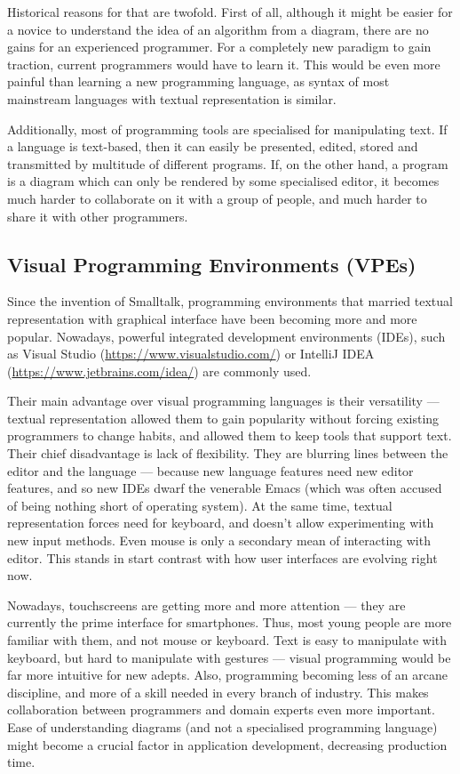 \documentclass[11pt]{scrartcl}
\begin{document}
Historical reasons for that are twofold.
First of all, although it might be easier for a novice to understand the idea of
an algorithm from a diagram, there are no gains for an experienced programmer.
For a completely new paradigm to gain traction, current programmers would have
to learn it.
This would be even more painful than learning a new programming language, as
syntax of most mainstream languages with textual representation is similar.

Additionally, most of programming tools are specialised for manipulating text.
If a language is text-based, then it can easily be presented, edited, stored and
transmitted by multitude of different programs. If, on the other hand, a program
is a diagram which can only be rendered by some specialised editor, it becomes
much harder to collaborate on it with a group of people, and much harder to
share it with other programmers.

\subsection{Visual Programming Environments (VPEs)}
Since the invention of Smalltalk, programming environments that married textual
representation with graphical interface have been becoming more and more
popular.
Nowadays, powerful integrated development environments (IDEs), such as Visual
Studio (\url{https://www.visualstudio.com/}) or IntelliJ IDEA
(\url{https://www.jetbrains.com/idea/}) are commonly used.

Their main advantage over visual programming languages is their versatility ---
textual representation allowed them to gain popularity without forcing existing
programmers to change habits, and allowed them to keep tools that support text.
Their chief disadvantage is lack of flexibility. They are blurring lines between
the editor and the language ---
because new language features need new editor features, and so new IDEs dwarf
the venerable
Emacs (which was often accused of being nothing short of operating system).
At the same time, textual representation forces need for keyboard, and doesn't
allow experimenting with new input methods. Even mouse is only a secondary mean
of interacting with editor. This stands in start contrast with how user
interfaces are evolving right now.

Nowadays, touchscreens are getting more and more attention --- they are currently
the prime interface for smartphones.
Thus, most young people are more familiar with them, and not mouse or keyboard.
Text is easy to manipulate with keyboard, but hard to manipulate with gestures ---
visual programming would be far more intuitive for new adepts.
Also, programming becoming less of an arcane discipline, and more of
a skill needed in every branch of industry.
This makes collaboration between programmers and domain experts even more
important.
Ease of understanding diagrams (and not a specialised programming language) might become a
crucial factor in application development, decreasing production time.
\end{document}
